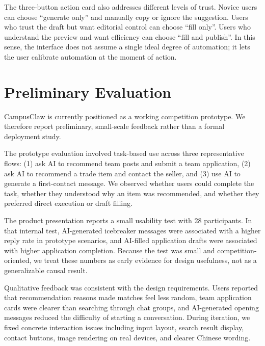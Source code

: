 \documentclass[sigconf]{acmart}
\begin{document}
The three-button action card also addresses different levels of trust. Novice users can choose ``generate only'' and manually copy or ignore the suggestion. Users who trust the draft but want editorial control can choose ``fill only''. Users who understand the preview and want efficiency can choose ``fill and publish''. In this sense, the interface does not assume a single ideal degree of automation; it lets the user calibrate automation at the moment of action.

\section{Preliminary Evaluation}
CampusClaw is currently positioned as a working competition prototype. We therefore report preliminary, small-scale feedback rather than a formal deployment study.

The prototype evaluation involved task-based use across three representative flows: (1) ask AI to recommend team posts and submit a team application, (2) ask AI to recommend a trade item and contact the seller, and (3) use AI to generate a first-contact message. We observed whether users could complete the task, whether they understood why an item was recommended, and whether they preferred direct execution or draft filling.

The product presentation reports a small usability test with 28 participants. In that internal test, AI-generated icebreaker messages were associated with a higher reply rate in prototype scenarios, and AI-filled application drafts were associated with higher application completion. Because the test was small and competition-oriented, we treat these numbers as early evidence for design usefulness, not as a generalizable causal result.

Qualitative feedback was consistent with the design requirements. Users reported that recommendation reasons made matches feel less random, team application cards were clearer than searching through chat groups, and AI-generated opening messages reduced the difficulty of starting a conversation. During iteration, we fixed concrete interaction issues including input layout, search result display, contact buttons, image rendering on real devices, and clearer Chinese wording.
\end{document}
